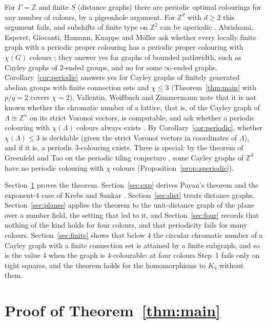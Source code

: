 \documentclass[11pt,a4paper]{amsart}
\theoremstyle{definition}
\newcommand{\Z}{\mathbb{Z}}
\begin{document}
For $\Gamma=\Z$ and finite $S$ (distance graphs) there are periodic optimal colourings for any number of colours,
by a pigeonhole argument. For $\Z^d$ with $d\ge2$ this argument fails, and subshifts of finite type on $\Z^2$ can be
aperiodic \cite{Berger,Robinson}.
Abrishami, Esperet, Giocanti, Hamann, Knappe and M\"oller ask whether every locally finite graph with a periodic
proper colouring has a periodic proper colouring with $\chi(G)$ colours \cite[Problem~4.6]{AEGHKM}; they answer yes for graphs of
bounded pathwidth, such as Cayley graphs of $2$-ended groups, and no for some $\infty$-ended graphs.
Corollary~\ref{cor:periodic} answers yes for Cayley graphs of finitely generated abelian groups with finite
connection sets and $\chi\le3$ (Theorem~\ref{thm:main} with $p/q=2$ covers $\chi=2$).
Vallentin, Wei{\ss}bach and Zimmermann note that it is not known whether the chromatic number of a lattice, that is, of
the Cayley graph of $\Lambda\cong\Z^n$ on its strict Voronoi vectors, is computable, and ask whether a periodic
colouring with $\chi(\Lambda)$ colours always exists \cite{VWZ}. By Corollary~\ref{cor:periodic}, whether
$\chi(\Lambda)\le3$ is decidable (given the strict Voronoi vectors in coordinates of $\Lambda$), and if it is, a periodic $3$-colouring exists. Three is special: by the theorem
of Greenfeld and Tao on the periodic tiling conjecture \cite{GT}, some Cayley graphs of $\Z^d$ have no periodic
colouring with $\chi$ colours (Proposition~\ref{prop:aperiodic}).

Section~\ref{sec:proof} proves the theorem. Section~\ref{sec:exp} derives Payan's theorem \cite{Payan} and the
exponent-$4$ case of Krebs and Sankar \cite{KS}. Section~\ref{sec:dist} treats distance graphs.
Section~\ref{sec:planes} applies the theorem to the unit-distance graph of the plane over a number field, the
setting that led to it, and Section~\ref{sec:four} records that nothing of the kind holds for four colours, and
that periodicity fails for many colours. Section~\ref{sec:finite} shows that below $4$ the circular chromatic number
of a Cayley graph with a finite connection set is attained by a finite subgraph, and so is the value $4$ when the
graph is $4$-colourable: at four colours Step~1 fails only on tight squares, and the theorem holds for the
homomorphisms to $K_4$ without them.

\section{Proof of Theorem~\ref{thm:main}}\label{sec:proof}
\end{document}
